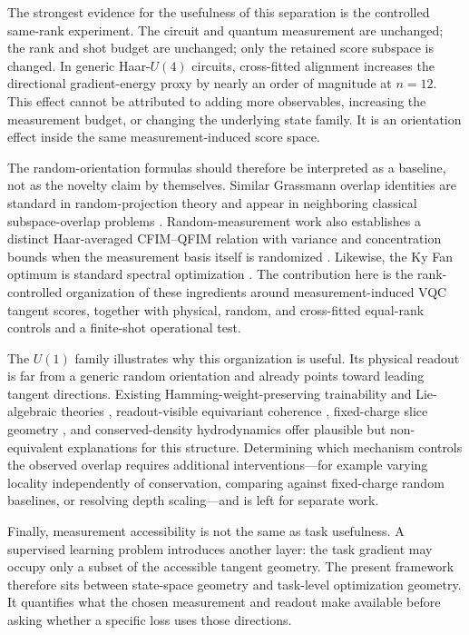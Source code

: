 \documentclass[aps,prx,reprint,superscriptaddress,nofootinbib,longbibliography]{revtex4-2}
\begin{document}
The strongest evidence for the usefulness of this separation is the controlled same-rank experiment. The circuit and quantum measurement are unchanged; the rank and shot budget are unchanged; only the retained score subspace is changed. In generic Haar-$U(4)$ circuits, cross-fitted alignment increases the directional gradient-energy proxy by nearly an order of magnitude at $n=12$. This effect cannot be attributed to adding more observables, increasing the measurement budget, or changing the underlying state family. It is an orientation effect inside the same measurement-induced score space.

The random-orientation formulas should therefore be interpreted as a baseline, not as the novelty claim by themselves. Similar Grassmann overlap identities are standard in random-projection theory and appear in neighboring classical subspace-overlap problems \cite{Fernandez2025}. Random-measurement work also establishes a distinct Haar-averaged CFIM--QFIM relation with variance and concentration bounds when the measurement basis itself is randomized \cite{LuSha2025}. Likewise, the Ky Fan optimum is standard spectral optimization \cite{KyFan1949}. The contribution here is the rank-controlled organization of these ingredients around measurement-induced VQC tangent scores, together with physical, random, and cross-fitted equal-rank controls and a finite-shot operational test.

The $U(1)$ family illustrates why this organization is useful. Its physical readout is far from a generic random orientation and already points toward leading tangent directions. Existing Hamming-weight-preserving trainability and Lie-algebraic theories \cite{Monbroussou2025,Fontana2024,Ragone2024}, readout-visible equivariant coherence \cite{UgailHoward2026}, fixed-charge slice geometry \cite{Filmus2016}, and conserved-density hydrodynamics \cite{Khemani2018,Rakovszky2018} offer plausible but non-equivalent explanations for this structure. Determining which mechanism controls the observed overlap requires additional interventions---for example varying locality independently of conservation, comparing against fixed-charge random baselines, or resolving depth scaling---and is left for separate work.

Finally, measurement accessibility is not the same as task usefulness. A supervised learning problem introduces another layer: the task gradient may occupy only a subset of the accessible tangent geometry. The present framework therefore sits between state-space geometry and task-level optimization geometry. It quantifies what the chosen measurement and readout make available before asking whether a specific loss uses those directions.
\end{document}

